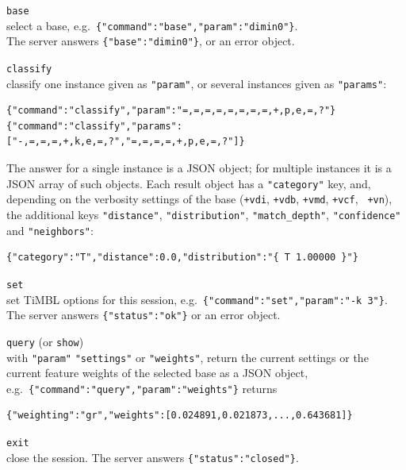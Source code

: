 \documentclass{report}
\begin{document}
\begin{description}
\item {\tt base}\\
  select a base, e.g.\ \verb|{"command":"base","param":"dimin0"}|.\\
  The server answers \verb|{"base":"dimin0"}|, or an error object.
\item {\tt classify}\\
  classify one instance given as {\tt "param"}, or several instances
  given as {\tt "params"}:
\begin{footnotesize}
\begin{verbatim}
{"command":"classify","param":"=,=,=,=,=,=,=,=,+,p,e,=,?"}
{"command":"classify","params":["-,=,=,=,+,k,e,=,?","=,=,=,=,+,p,e,=,?"]}
\end{verbatim}
\end{footnotesize}
  The answer for a single instance is a JSON object; for multiple
  instances it is a JSON array of such objects. Each result object has
  a {\tt "category"} key, and, depending on the verbosity settings of
  the base ({\tt +vdi}, {\tt +vdb}, {\tt +vmd}, {\tt +vcf}, {\tt
    +vn}), the additional keys {\tt "distance"}, {\tt "distribution"},
  {\tt "match\_depth"}, {\tt "confidence"} and {\tt "neighbors"}:
\begin{footnotesize}
\begin{verbatim}
{"category":"T","distance":0.0,"distribution":"{ T 1.00000 }"}
\end{verbatim}
\end{footnotesize}
\item {\tt set}\\
  set TiMBL options for this session, e.g.\
  \verb|{"command":"set","param":"-k 3"}|.  The server answers
  \verb|{"status":"ok"}| or an error object.
\item {\tt query} (or {\tt show})\\
  with {\tt "param"} {\tt "settings"} or {\tt "weights"}, return the
  current settings or the current feature weights of the selected base
  as a JSON object, e.g.\
  \verb|{"command":"query","param":"weights"}| returns
\begin{footnotesize}
\begin{verbatim}
{"weighting":"gr","weights":[0.024891,0.021873,...,0.643681]}
\end{verbatim}
\end{footnotesize}
\item {\tt exit}\\
  close the session. The server answers \verb|{"status":"closed"}|.
\end{description}
\end{document}
